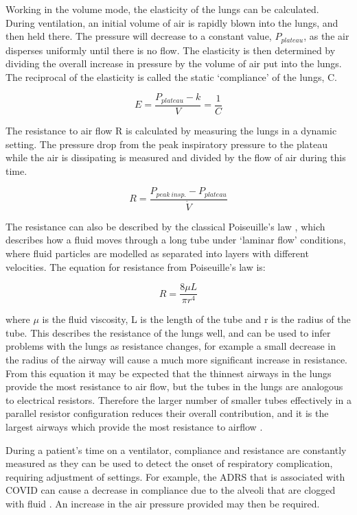 \documentclass[11pt]{report}
\begin{document}
Working in the volume mode, the elasticity of the lungs can be calculated. During ventilation, an initial volume of air is rapidly blown into the lungs, and then held there. The pressure will decrease to a constant value, $P_{plateau}$, as the air disperses uniformly until there is no flow. The elasticity is then determined by dividing the overall increase in pressure by the volume of air put into the lungs. The reciprocal of the elasticity is called the static ‘compliance’ of the lungs, C.

\begin{equation}
    E = \frac{P_{plateau}-k}{V} = \frac{1}{C}
\end{equation}

The resistance to air flow R is calculated by measuring the lungs in a dynamic setting. The pressure drop from the peak inspiratory pressure to the plateau while the air is dissipating is measured and divided by the flow of air during this time.

\begin{equation}
    R = \frac{P_{peak\:{}insp.}-P_{plateau}}{\dot{V}}
\end{equation}

The resistance can also be described by the classical Poiseuille’s law \cite{vent2}, which describes how a fluid moves through a long tube under ‘laminar flow’ conditions, where fluid particles are modelled as separated into layers with different velocities. The equation for resistance from Poiseuille’s law is:

\begin{equation}
    R=\frac{8\mu{}L}{\pi{}r^{4}}
\end{equation}

where $\mu{}$ is the fluid viscosity, L is the length of the tube and r is the radius of the tube. This describes the resistance of the lungs well, and can be used to infer problems with the lungs as resistance changes, for example a small decrease in the radius of the airway will cause a much more significant increase in resistance. From this equation it may be expected that the thinnest airways in the lungs provide the most resistance to air flow, but the tubes in the lungs are analogous to electrical resistors. Therefore the larger number of smaller tubes effectively in a parallel resistor configuration reduces their overall contribution, and it is the largest airways which provide the most resistance to airflow \cite{vent3}.

During a patient’s time on a ventilator, compliance and resistance are constantly measured as they can be used to detect the onset of respiratory complication, requiring adjustment of settings. For example, the ADRS that is associated with COVID can cause a decrease in compliance due to the alveoli that are clogged with fluid \cite{vent4}. An increase in the air pressure provided may then be required.
\end{document}
